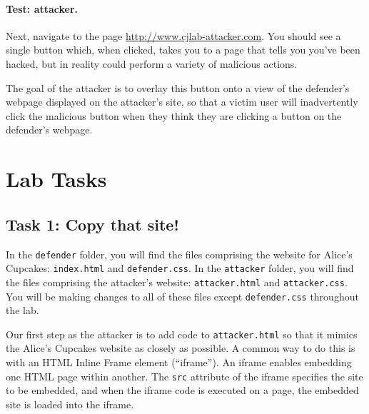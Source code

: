 \paragraph{Test: attacker.}
Next, navigate to the page \url{http://www.cjlab-attacker.com}.  You
should see a single button which, when clicked, takes you to a page that
tells you you've been hacked, but in reality could perform a variety of
malicious actions.  

The goal of the attacker is to overlay this button onto a view of the
defender's webpage displayed on the attacker's site, so that a victim
user will inadvertently click the malicious button when they think they
are clicking a button on the defender's webpage.


\section{Lab Tasks} 


\subsection{Task 1: Copy that site!}

In the \texttt{defender} folder, you will find the files comprising the
website for Alice's Cupcakes: \texttt{index.html} and
\texttt{defender.css}.  In the \texttt{attacker} folder, you will find
the files comprising the attacker's website: \texttt{attacker.html} and
\texttt{attacker.css}.  You will be making changes to all of these files
except \texttt{defender.css} throughout the lab. 

Our first step as the attacker is to add code to \texttt{attacker.html}
so that it mimics the Alice's Cupcakes website as closely as possible.
A common way to do this is with an HTML Inline Frame element
(``iframe''). An iframe enables embedding one HTML page within another.
The \texttt{src} attribute of the iframe specifies the site to be
embedded, and when the iframe code is executed on a page, the embedded
site is loaded into the iframe. 

